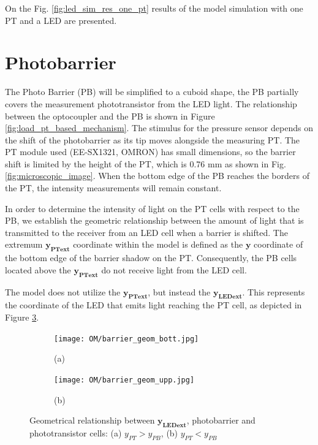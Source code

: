 On the Fig. \ref{fig:led_sim_res_one_pt} results of the model simulation with one PT and a LED are presented.

\section{Photobarrier}
The Photo Barrier (PB) will be simplified to a cuboid shape, the PB partially covers the measurement phototransistor from the LED light. The relationship between the optocoupler and the PB is shown in Figure \ref{fig:load_pt_based_mechanism}. 
The stimulus for the pressure sensor depends on the shift of the photobarrier 
as its tip moves alongside the measuring PT. 
The PT module used (EE-SX1321, OMRON) has small dimensions, 
so the barrier shift is limited by the height of the PT, which is 0.76 mm as shown in Fig. \ref{fig:microscopic_image}. 
When the bottom edge of the PB reaches the borders of the PT, 
the intensity measurements will remain constant.

In order to determine the intensity of light on the PT cells with respect to the PB, 
we establish the geometric relationship between the amount of light that 
is transmitted to the receiver from an LED cell when a barrier is shifted. 
The extremum $\boldsymbol{y_{\text{PT}ext}}$ coordinate within the model is defined 
as the $\boldsymbol{y}$ coordinate of the bottom edge of the barrier shadow on the PT.
Consequently, the PB cells located above the $\boldsymbol{y_{\text{PT}ext}}$ 
do not receive light from the LED cell.

The model does not utilize the $\boldsymbol{y_{\text{PT}ext}}$, but instead the $\boldsymbol{y_{\text{LED}ext}}$. 
This represents the coordinate of the LED that emits light reaching the PT cell, 
as depicted in Figure \ref{fig:extremum_ys_cell}.

\begin{figure}[H]
  \centering
  \begin{subfigure}[b]{0.5\textwidth}
    \texttt{[image: OM/barrier\_geom\_bott.jpg]}
    \centering
    \label{fig:extremum_ys_cell_bottom}
    \caption*{(a)}
  \end{subfigure}
  \begin{subfigure}[b]{0.5\textwidth}
    \texttt{[image: OM/barrier\_geom\_upp.jpg]}
    \label{fig:extremum_ys_cell_upp}
    \caption*{(b)}
  \end{subfigure}
  \caption{Geometrical relationship between $\boldsymbol{y_{\text{LED}ext}}$, photobarrier and phototransistor cells: (a) $y_{PT} > y_{PB}$, (b)  $y_{PT} < y_{PB}$ }
  \label{fig:extremum_ys_cell}

\end{figure}

